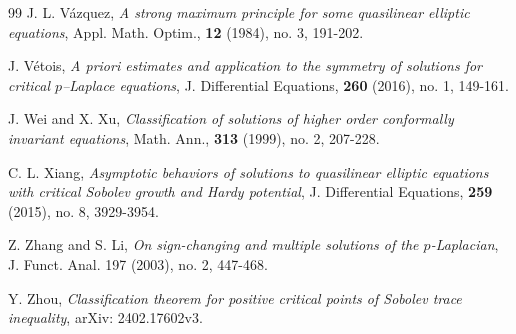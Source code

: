 \documentclass[12pt]{amsart}
\theoremstyle{definition}
\theoremstyle{remark}
\theoremstyle{conclusion}
\theoremstyle{conjecture}
\numberwithin{equation}{section}
\begin{document}
\begin{thebibliography}{99}
 J. L. V\'{a}zquez, {\it A strong maximum principle for some quasilinear elliptic equations}, Appl. Math. Optim., \textbf{12} (1984), no. 3, 191-202.

 J. V\'{e}tois, {\it A priori estimates and application to the symmetry of solutions for critical $p$--Laplace equations}, J. Differential Equations, \textbf{260} (2016), no. 1, 149-161.

 J. Wei and X. Xu, {\it Classification of solutions of higher order conformally invariant equations}, Math. Ann., \textbf{313} (1999), no. 2, 207-228.

 C. L. Xiang, {\it Asymptotic behaviors of solutions to quasilinear elliptic equations with critical Sobolev growth and Hardy potential}, J. Differential Equations, \textbf{259} (2015), no. 8, 3929-3954.

 Z. Zhang and S. Li, {\it On sign-changing and multiple solutions of the $p$-Laplacian}, J. Funct. Anal. 197 (2003), no. 2, 447-468.

 Y. Zhou, {\it Classification theorem for positive critical points of Sobolev trace inequality}, arXiv: 2402.17602v3.

\end{thebibliography}
\end{document}

